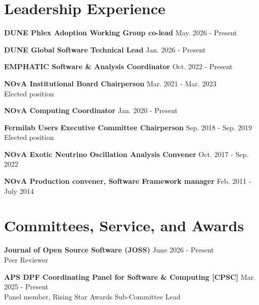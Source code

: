 \documentclass[margin, line]{res}
\renewcommand{\em}{\upshape\sffamily}
\begin{document}
\begin{resume}
\section{\sc Leadership Experience}
{\bf DUNE Phlex Adoption Working Group co-lead} \hfill {May. 2026 - Present}\\
\vspace{-.3cm}

{\bf DUNE Global Software Technical Lead} \hfill {Jan. 2026 - Present}\\
\vspace{-.3cm}

{\bf EMPHATIC Software \& Analysis Coordinator} \hfill {Oct. 2022 - Present}\\
\vspace{-.3cm}

{\bf NOvA Institutional Board Chairperson} \hfill {Mar. 2021 - Mar. 2023}\\
{\em Elected position}\\
\vspace{-.3cm}

{\bf NOvA Computing Coordinator} \hfill {Jan. 2020 - Present}\\
\vspace{-.3cm}

{\bf Fermilab Users Executive Committee Chairperson} \hfill {Sep. 2018 - Sep. 2019}\\
{\em Elected position}\\
\vspace{-.3cm}

{\bf NOvA Exotic Neutrino Oscillation Analysis Convener} \hfill {Oct. 2017 - Sep. 2022}\\
\vspace{-.3cm}

{\bf NOvA Production convener, Software Framework manager} \hfill {Feb. 2011 - July 2014}\\

\section{\sc Committees, Service, and Awards}
{\bf Journal of Open Source Software (JOSS)} \hfill {June 2026 - Present}\\
{\em Peer Reviewer}\\
\vspace{-.3cm}

{\bf APS DPF Coordinating Panel for Software \& Computing [CPSC]} \hfill {Mar. 2025 - Present}\\
{\em Panel member, Rising Star Awards Sub-Committee Lead}\\
\vspace{-.3cm}


\end{resume}
\end{document}
